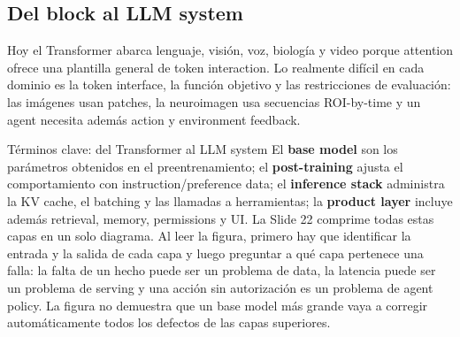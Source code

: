 
\subsection{Del block al LLM system}

Hoy el Transformer abarca lenguaje, visión, voz, biología y video porque attention ofrece una plantilla general de token interaction. Lo realmente difícil en cada dominio es la token interface, la función objetivo y las restricciones de evaluación: las imágenes usan patches, la neuroimagen usa secuencias ROI-by-time y un agent necesita además action y environment feedback.





\begin{knowledgebox}{Términos clave: del Transformer al LLM system}
El \textbf{base model} son los parámetros obtenidos en el preentrenamiento; el \textbf{post-training} ajusta el comportamiento con instruction/preference data; el \textbf{inference stack} administra la KV cache, el batching y las llamadas a herramientas; la \textbf{product layer} incluye además retrieval, memory, permissions y UI. La Slide 22 comprime todas estas capas en un solo diagrama. Al leer la figura, primero hay que identificar la entrada y la salida de cada capa y luego preguntar a qué capa pertenece una falla: la falta de un hecho puede ser un problema de data, la latencia puede ser un problema de serving y una acción sin autorización es un problema de agent policy. La figura no demuestra que un base model más grande vaya a corregir automáticamente todos los defectos de las capas superiores.
\end{knowledgebox}


